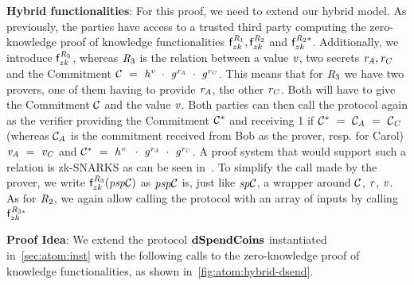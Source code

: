 \textbf{Hybrid functionalities}: For this proof, we need to extend our hybrid model.
As previously, the parties have access to a trusted third party computing the zero-knowledge proof of knowledge functionalities $\mathsf{f}^{\mathit{R}_1}_{zk}, \mathsf{f}^{\mathit{R}_2}_{zk}$ and $\mathsf{f}^{\mathit{R}_2*}_{zk}$.
Additionally, we introduce $\mathsf{f}^{\mathit{R}_3}_{zk}$, whereas $\mathit{R}_3$ is the relation between a value $\mathit{v}$, two secrets $\mathit{r}_{\mathit{A}}, \mathit{r}_{\mathit{C}}$ and the Commitment $\mathcal{C} ~=~ \mathit{h}^{\mathit{v}} ~\cdot~ \mathit{g}^{\mathit{r}_{\mathit{A}}} ~\cdot~ \mathit{g}^{\mathit{r}_{\mathit{C}}}$.
This means that for $\mathit{R}_3$ we have two provers, one of them having to provide $\mathit{r}_{\mathit{A}}$, the other $\mathit{r}_{\mathit{C}}$.
Both will have to give the Commitment $\mathcal{C}$ and the value $\mathit{v}$.
Both parties can then call the protocol again as the verifier providing the Commitment $\mathcal{C}^*$ and receiving 1 if $\mathcal{C}^* ~=~ \mathcal{C}_{\mathit{A}} ~=~ \mathcal{C}_{\mathit{C}}$ (whereas $\mathcal{C}_{\mathit{A}}$ is the commitment received from Bob as the prover, resp. for Carol) $\mathit{v}_{\mathit{A}} ~=~ \mathit{v}_{\mathit{C}}$ and $\mathcal{C}^* ~=~ \mathit{h}^{\mathit{v}_{\cdot}} ~\cdot~ \mathit{g}^{\mathit{r}_{\mathit{A}}} ~\cdot~ \mathit{g}^{\mathit{r}_{\mathit{C}}}$.
A proof system that would support such a relation is zk-SNARKS as can be seen in~\cite{ben2013snarks}.
To simplify the call made by the prover, we write $\mathsf{f}^{\mathit{R}_3}_{zk}(\mathit{psp}\mathcal{C})$ as $\mathit{psp}\mathcal{C}$ is, just like $\mathit{sp}\mathcal{C}$, a wrapper around $\mathcal{C}$, $\mathit{r}$, $\mathit{v}$.
As for $\mathit{R}_2$, we again allow calling the protocol with an array of inputs by calling $\mathsf{f}^{\mathit{R}_{3*}}_{zk}$

\textbf{Proof Idea}: We extend the protocol $\mathbf{dSpendCoins}$ instantiated in~\cref{sec:atom:inst} with the following calls to the zero-knowledge proof of knowledge functionalities, as shown in~\cref{fig:atom:hybrid-dsend}.

